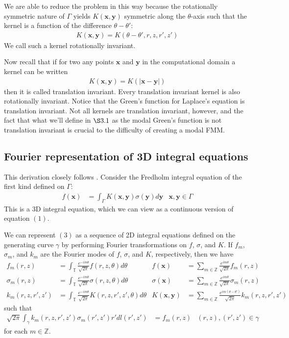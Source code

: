 \documentclass[11pt, oneside]{article}   	%
\begin{document}
We are able to reduce the problem in this way because the rotationally symmetric nature of $\Gamma$ yields $K(\mathbf{x},\mathbf{y})$ symmetric along the $\theta$-axis such that the kernel is a function of the difference $\theta-\theta'$:
\begin{align*}
K(\mathbf{x},\mathbf{y})=K(\theta-\theta',r,z,r',z')
\end{align*}
We call such a kernel rotationally invariant.

Now recall that if for two any points $\mathbf{x}$ and $\mathbf{y}$ in the computational domain a kernel can be written
\begin{align*}
K(\mathbf{x},\mathbf{y}) = K(|\mathbf{x}-\mathbf{y}|)
\end{align*}
then it is called translation invariant. Every translation invariant kernel is also rotationally invariant. Notice that the Green's function for Laplace's equation is translation invariant. Not all kernels are translation invariant, however, and the fact that what we'll define in $\S3.1$ as the modal Green's function is not translation invariant is crucial to the difficulty of creating a modal FMM.

\subsection{Fourier representation of 3D integral equations}
This derivation closely follows \cite{YYM}. Consider the Fredholm integral equation of the first kind defined on $\Gamma$:
\begin{align}
f(\mathbf{x}) &= \int_\Gamma K(\mathbf{x},\mathbf{y})\sigma(\mathbf{y})d\mathbf{y} &\mathbf{x},\mathbf{y}\in\Gamma
\end{align}
This is a 3D integral equation, which we can view as a continuous version of equation $(1)$.

We can represent $(3)$ as a sequence of 2D integral equations defined on the generating curve $\gamma$ by performing Fourier transformations on $f$, $\sigma$, and $K$. If $f_m$, $\sigma_m$, and $k_m$ are the Fourier modes of $f$, $\sigma$, and $K$, respectively, then we have
\begin{align*}
f_m(r,z)&=\int_\mathbb{T}\frac{e^{-im\theta}}{\sqrt{2\pi}}f(r,z,\theta)d\theta&f(\mathbf{x})&=\sum_{m\in\mathbb{Z}}\frac{e^{im\theta}}{\sqrt{2\pi}}f_m(r,z)\\
\sigma_m(r,z)&=\int_\mathbb{T}\frac{e^{-im\theta}}{\sqrt{2\pi}}\sigma(r,z,\theta)d\theta&\sigma(\mathbf{x})&=\sum_{m\in\mathbb{Z}}\frac{e^{im\theta}}{\sqrt{2\pi}}\sigma_m(r,z)\\
k_m(r,z,r',z')&=\int_\mathbb{T}\frac{e^{-im\theta}}{\sqrt{2\pi}}K(r,z,r',z',\theta)d\theta&K(\mathbf{x},\mathbf{y})&=\sum_{m\in\mathbb{Z}}\frac{e^{im(\theta-\theta')}}{\sqrt{2\pi}}k_m(r,z,r',z')
\end{align*}
such that
\begin{align}
\sqrt{2\pi}\int_\gamma k_m(r,z,r',z')\sigma_m(r',z')r'dl(r',z')&=f_m(r,z) &(r,z),(r',z')\in\gamma
\end{align}
for each $m\in\mathbb{Z}$.
\end{document}
